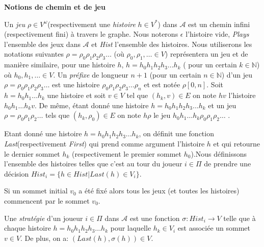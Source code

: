 \noindent\textbf{Notions de chemin et de jeu}


Un \textit{jeu} $\rho \in V^{\omega}$(respectivement une \textit{histoire} $h \in V^{*}$) dans $\mathcal{A}$ est un chemin infini (respectivement fini) à travers le graphe. Nous noterons $\epsilon$ l'histoire vide, \textit{Plays} l'ensemble des jeux dans $\mathcal{A}$ et \textit{Hist} l'ensemble des histoires. Nous utiliserons les notations suivantes $\rho = \rho _{0}  \rho _{1} \rho _{2}\rho _{3} \ldots$ (où $\rho _{0},  \rho _{1},\ldots \in V$)  représentera un jeu et de manière similaire, pour une histoire $h$, $ h = h_{0} h_{1} h_{2} h_{3} ... h_{k}$ ( pour un certain $k \in \mathbb{N}$) où  $h_{0}, h_{1}, \ldots \in V$.
Un \textit{préfixe} de longueur $n+1$ (pour un certain $n\in \mathbb{N}$) d'un jeu $\rho = \rho _{0}  \rho _{1} \rho _{2}\rho _{3} \ldots$ est une histoire $\rho _{0}  \rho _{1} \rho _{2}\rho _{3} \ldots \rho _{n}$ et est notée $\rho[0,n]$. Soit $ h = h_{0} h_{1} \ldots h_{k}$ une histoire et soit $v \in V$ tel que $(h_{k},v)\in E$ on note $hv$ l'histoire $h_{0} h_{1} \ldots h_{k}v$. De même, étant donné une histoire $ h = h_{0} h_{1} h_{2} h_{3} ... h_{k}$ et un jeu $\rho = \rho _{0}  \rho _{1} \rho _{2} \ldots$ tels que $(h_{k},\rho_{0})\in E$ on note $h\rho$ le jeu $ h_{0} h_{1} \ldots h_{k}\rho _{0}  \rho _{1} \rho _{2} \ldots$ .

Etant donné une histoire $ h = h_{0} h_{1} h_{2} h_{3} ... h_{k}$,  on définit une fonction \textit{Last}(respectivement \textit{First}) qui prend comme argument l'histoire $h$ et qui retourne le dernier sommet $h_{k}$ (respectivement le premier sommet $h_{0}$).Nous définissons l'ensemble des histoires telles que c'est au tour du joueur $i \in \Pi$ de prendre une décision $Hist_{i} = \{ h \in Hist | Last(h) \in V_{i} \}$.

\begin{rem}
	Si un sommet initial $v_{0}$ a été fixé alors tous les jeux (et toutes les histoires) commencent par le sommet $v_{0}.$\\
\end{rem}


\begin{defi}[Stratégie]
	Une \textit{stratégie} d'un joueur $i \in \Pi$ dans $\mathscr{A}$ est une fonction \mbox{$\sigma:Hist_{i} \rightarrow V$} telle que à chaque histoire $ h = h_{0} h_{1} h_{2} h_{3} ... h_{k}$ pour laquelle $h_{k} \in V_{i}$ est associée un sommet $v \in V$. De plus, on a: $(Last(h),\sigma(h))\in V$.
\end{defi}

